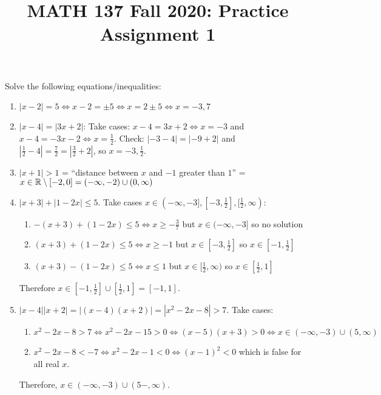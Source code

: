 \documentclass{agony}
\title{MATH 137 Fall 2020: Practice Assignment 1}
\begin{document}
\thispagestyle{firstpage}

\textbf{\thetitle}

\question Solve the following equations/inequalities:
\begin{enumerate}
  \item $|x-2|=5\iff x-2=\pm5\iff x=2\pm5\iff x=-3,7$
  \item $|x-4|=|3x+2|$: Take cases: $x-4=3x+2\iff x=-3$ and $x-4=-3x-2\iff x=\frac12$.
        Check: $|-3-4|=|-9+2|$ and $|\frac12-4|=\frac72=|\frac32+2|$, so $x=-3, \frac12$.
  \item $|x+1|>1$ = ``distance between $x$ and $-1$ greater than $1$'' = $x\in\mathbb{R}\setminus[-2,0]=(-\infty,-2)\cup(0,\infty)$
  \item $|x+3|+|1-2x|\leq5$. Take cases $x\in(-\infty,-3],[-3,\frac12],[\frac12,\infty)$:
        \begin{enumerate}[1.]
          \item $-(x+3)+(1-2x)\leq5\iff x\geq-\frac37$ but $x\in(-\infty,-3]$ so no solution
          \item $(x+3)+(1-2x)\leq5\iff x\geq-1$ but $x\in[-3,\frac12]$ so $x\in[-1,\frac12]$
          \item $(x+3)-(1-2x)\leq5\iff x\leq1$ but $x\in[\frac12,\infty)$ so $x\in[\frac12,1]$
        \end{enumerate}
        Therefore $x\in[-1,\frac12]\cup[\frac12,1]=[-1,1]$.
  \item $|x-4||x+2|=|(x-4)(x+2)|=|x^2-2x-8|>7$. Take cases:
        \begin{enumerate}[1.]
          \item $x^2-2x-8>7\iff x^2-2x-15>0\iff(x-5)(x+3)>0\iff x\in(-\infty,-3)\cup(5,\infty)$
          \item $x^2-2x-8<-7\iff x^2-2x-1<0\iff (x-1)^2<0$ which is false for all  real $x$.
        \end{enumerate}
        Therefore, $x\in(-\infty,-3)\cup(5-,\infty)$.
\end{enumerate}
\end{document}
